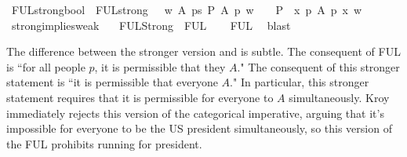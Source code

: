 \begin{isabellebody}
\ FUL{\isacharunderscore}strong{\isacharcolon}{\isacharcolon}bool\ \ {\isachardoublequoteopen}FUL{\isacharunderscore}strong\ {\isasymequiv}\ \ {\isasymforall}w\ A{\isachardot}\ {\isacharparenleft}{\isacharparenleft}{\isasymexists}p{\isacharcolon}{\isacharcolon}s{\isachardot}\ {\isacharparenleft}{\isacharparenleft}P\ {\isacharbraceleft}A\ p{\isacharbraceright}{\isacharparenright}\ w{\isacharparenright}{\isacharparenright}\ \ {\isasymlongrightarrow}{\isacharparenleft}\ {\isacharparenleft}{\isacharparenleft}\ P\ {\isacharbraceleft}\ {\isasymlambda}x{\isachardot}\ {\isasymforall}p{\isachardot}\ A\ p\ x{\isacharbraceright}{\isacharparenright}\ w{\isacharparenright}{\isacharparenright}{\isacharparenright}{\isachardoublequoteclose}\isanewline
\isanewline
{}\isamarkupfalse%
\ strong{\isacharunderscore}implies{\isacharunderscore}weak{\isacharcolon}\isanewline
\ \ \ {\isachardoublequoteopen}FUL{\isacharunderscore}Strong\ {\isasymlongrightarrow}\ FUL{\isachardoublequoteclose}\isanewline
%
\isadelimproof
\ \ %
\endisadelimproof
%
\isatagproof
{}\isamarkupfalse%
\ FUL\ \isamarkupfalse%
\ blast\isanewline
%
%
\endisatagproof
{\isafoldproof}%
%
\isadelimproof
%
\endisadelimproof
%
\begin{isamarkuptext}%
The difference between the stronger version and  is subtle. The consequent of FUL is ``for all people $p$,
it is permissible that they $A$." The consequent of this stronger statement is ``it is permissible that 
everyone $A$." In particular, this stronger statement requires that it is permissible for everyone to
 $A$ simultaneously. Kroy immediately rejects this version of the categorical imperative, arguing that 
it's impossible for everyone to be the US president simultaneously, so this version of the FUL prohibits
running for president.


\end{isamarkuptext}
\end{isabellebody}
